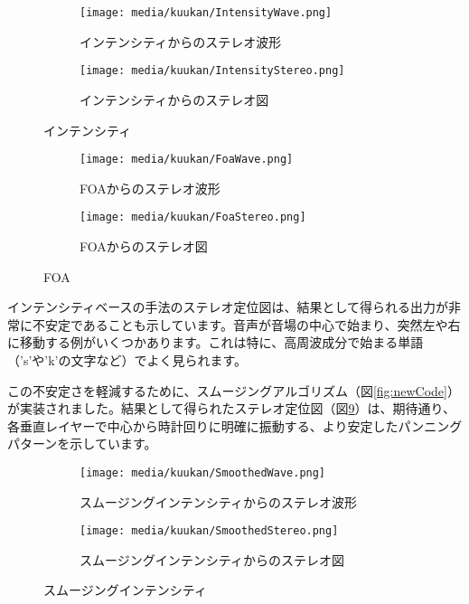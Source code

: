 \documentclass[a4paper, 12pt]{article}
\begin{document}
\begin{figure}[h!]
\centering
\begin{subfigure}{1.0\textwidth}
  \centering
  \texttt{[image: media/kuukan/IntensityWave.png]}
  \caption{インテンシティからのステレオ波形}
  \label{fig:intWave}
\end{subfigure}
\vspace{5mm}
\begin{subfigure}{1.0\textwidth}
  \centering
  \texttt{[image: media/kuukan/IntensityStereo.png]}
  \caption{インテンシティからのステレオ図}
  \label{fig:intSte}
\end{subfigure}
\caption{インテンシティ}
\label{fig:intensity}
\end{figure}

\begin{figure}
\centering
\begin{subfigure}{1.0\textwidth}
  \centering
  \texttt{[image: media/kuukan/FoaWave.png]}
  \caption{FOAからのステレオ波形}
  \label{fig:ambWave}
\end{subfigure}
\vspace{5mm}
\begin{subfigure}{1.0\textwidth}
  \centering
  \texttt{[image: media/kuukan/FoaStereo.png]}
  \caption{FOAからのステレオ図}
  \label{fig:ambSte}
\end{subfigure}
\caption{FOA}
\label{fig:amb}
\end{figure}

インテンシティベースの手法のステレオ定位図は、結果として得られる出力が非常に不安定であることも示しています。音声が音場の中心で始まり、突然左や右に移動する例がいくつかあります。これは特に、高周波成分で始まる単語（'s'や'k'の文字など）でよく見られます。

この不安定さを軽減するために、スムージングアルゴリズム（図\ref{fig:newCode}）が実装されました。結果として得られたステレオ定位図（図\ref{fig:smoothed}）は、期待通り、各垂直レイヤーで中心から時計回りに明確に振動する、より安定したパンニングパターンを示しています。

\begin{figure}
\centering
\begin{subfigure}{1.0\textwidth}
  \centering
  \texttt{[image: media/kuukan/SmoothedWave.png]}
  \caption{スムージングインテンシティからのステレオ波形}
  \label{fig:smoWave}
\end{subfigure}
\vspace{5mm}
\begin{subfigure}{1.0\textwidth}
  \centering
  \texttt{[image: media/kuukan/SmoothedStereo.png]}
  \caption{スムージングインテンシティからのステレオ図}
  \label{fig:smoSte}
\end{subfigure}
\caption{スムージングインテンシティ}
\label{fig:smoothed}
\end{figure}
\end{document}
